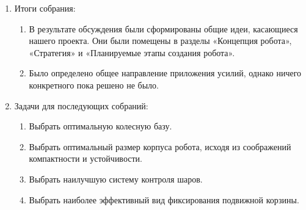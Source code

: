 \begin{enumerate}
\begin{enumerate}
\begin{enumerate}
\begin{enumerate}
        \end{enumerate}
      \end{enumerate}
    \end{enumerate}
    
	\item Итоги собрания: \newline
	\begin{enumerate}
	  \item В результате обсуждения были сформированы общие идеи, касающиеся нашего проекта. Они были помещены в разделы «Концепция робота»,  «Стратегия» и «Планируемые этапы создания робота».\newline
	  
      \item Было определено общее направление приложения усилий, однако ничего конкретного пока решено не было.\newline
      
    \end{enumerate}
    
	\item Задачи для последующих собраний:\newline
	\begin{enumerate}
	  \item Выбрать оптимальную колесную базу.\newline
	  
	  \item Выбрать оптимальный размер корпуса робота, исходя из соображений компактности и устойчивости.\newline
	  
	  \item Выбрать наилучшую систему контроля шаров.\newline
	  
	  \item Выбрать наиболее эффективный вид фиксирования подвижной корзины.\newline
	  
    \end{enumerate}     
\end{enumerate}

\fillpage



